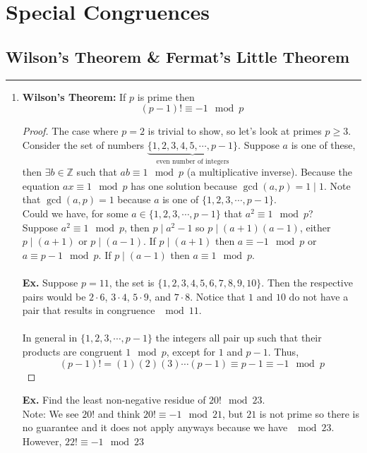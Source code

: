 \documentclass[class=article, crop=false]{standalone}
\def\integers{{\mathbb Z}}
\begin{document}
    
\section{Special Congruences}

\subsection{Wilson's Theorem \& Fermat's Little Theorem}
\rule{\textwidth}{1pt}
\begin{enumerate}[1.]
	\item \textbf{Wilson's Theorem:}
	If $p$ is prime then $$(p-1)!\equiv -1\mod p$$
	\begin{proof}
		The case where $p=2$ is trivial to show, so let's look at primes $p\geq 3$.
		Consider the set of numbers $\underbrace{\{1,2,3,4,5,\cdots,p-1\}}_{\text{even number of integers}}$.
		Suppose $a$ is one of these, then $\exists b\in\integers$ such that $ab\equiv 1\mod p$ (a multiplicative inverse).
		Because the equation $ax\equiv 1\mod p$ has one solution because $\gcd(a,p)=1\mid1$.
		Note that $\gcd(a,p)=1$ because $a$ is one of $\{1,2,3,\cdots,p-1\}$.\\
		Could we have, for some $a\in\{1,2,3,\cdots, p-1\}$ that $a^2\equiv 1\mod p$?\\
		Suppose $a^2\equiv 1\mod p$, then $p\mid a^2-1$ so $p\mid (a+1)(a-1)$, either
		$p\mid (a+1)$ or $p\mid (a-1)$.
		If $p\mid (a+1)$ then $a\equiv -1\mod p$ or $a\equiv p-1\mod p$. If $p\mid(a-1)$
		then $a\equiv 1\mod p$.\\\\
		\textbf{Ex.} Suppose $p=11$, the set is $\{1,2,3,4,5,6,7,8,9,10\}$. Then the respective
		pairs would be $2\cdot6$, $3\cdot4$, $5\cdot9$, and $7\cdot8$. Notice that $1$ and $10$
		do not have a pair that results in congruence $\mod 11$.\\\\
		In general in $\{1,2,3,\cdots,p-1\}$ the integers all pair up such that their products
		are congruent $1\mod p$, except for $1$ and $p-1$. Thus,
		$$(p-1)!=(1)(2)(3)\cdots(p-1)\equiv p-1\equiv -1\mod p$$
	\end{proof}
	\noindent\textbf{Ex.} Find the least non-negative residue of $20!\mod 23$.\\
	Note: We see $20!$ and think $20!\equiv -1\mod 21$, but $21$ is not prime so there is
	no guarantee and it does not apply anyways because we have $\mod 23$.\\
	However, $22!\equiv -1\mod 23$

\end{enumerate}
\end{document}
